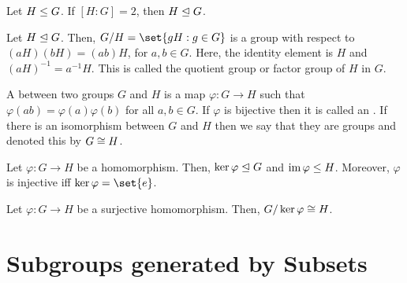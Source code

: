 \documentclass[11pt]{penrose}
\begin{document}
\begin{nthm}
    Let $H \mathrel{\leq} G$. If $[H:G] = 2$, then $H \mathrel{\trianglelefteq} G$.
\end{nthm}

\begin{nthm}
    Let $H \mathrel{\trianglelefteq} G$. Then, $G/H = \set{gH : g \in G}$ is a group with respect to $(aH)(bH) = (ab)H$, for $a, b \in G$. Here, the identity element is $H$ and $(aH)^{-1} = a^{-1} H$. This is called the quotient group or factor group of $H$ in $G$.
\end{nthm}

\begin{ndfn}[Homomorphism]
    A  between two groups $G$ and $H$ is a map $\varphi : G \to H$ such that $\varphi(ab) = \varphi(a)\varphi(b)$ for all $a,b \in G$. If $\varphi$ is bijective then it is called an . If there is an isomorphism between $G$ and $H$ then we say that they are  groups and denoted this by $G \mathrel{\cong} H$.
\end{ndfn}

\begin{nthm}
    Let $\varphi : G \to H$ be a homomorphism. Then, $\ker\varphi \mathrel{\trianglelefteq} G$ and $\operatorname{im}\varphi \mathrel{\leq} H$. Moreover, $\varphi$ is injective iff $\ker\varphi = \set{e}$.
\end{nthm}

\begin{nthm}
    Let $\varphi : G \to H$ be a surjective homomorphism. Then, $G / \ker\varphi \mathrel{\cong} H$.
\end{nthm}

\section{Subgroups generated by Subsets}
\end{document}
